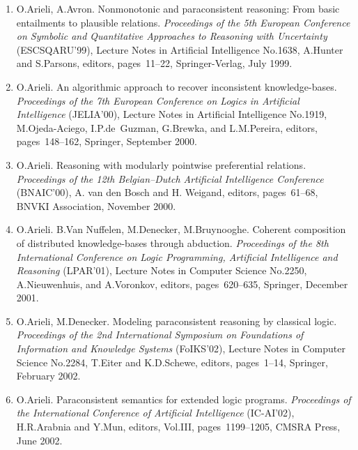 \documentclass{article}
\begin{document}
\begin{enumerate}
   \item O.Arieli, A.Avron.
         Nonmonotonic and paraconsistent reasoning: From basic entailments
         to plausible relations. {\em Proceedings of the 5th European Conference on
         Symbolic and Quantitative Approaches to Reasoning with
         Uncertainty\/} (ESCSQARU'99), Lecture Notes in
         Artificial Intelligence No.1638, A.Hunter and S.Parsons, editors,
         pages~11--22, Springer-Verlag, July 1999.

   \item O.Arieli.
         An algorithmic approach to recover inconsistent knowledge-bases.
         {\em Proceedings of the 7th European Conference on Logics in Artificial
         Intelligence\/} (JELIA'00), Lecture Notes in Artificial Intelligence
         No.1919, M.Ojeda-Aciego, I.P.de~Guzman, G.Brewka, and L.M.Pereira,
         editors, pages~148--162, Springer, September 2000.

   \item O.Arieli.
         Reasoning with modularly pointwise preferential relations.
         {\em Proceedings of the 12th Belgian--Dutch Artificial Intelligence
         Conference\/} (BNAIC'00), A. van den Bosch and H. Weigand, editors,
         pages~61--68, BNVKI Association, November 2000.

   \item O.Arieli. B.Van Nuffelen, M.Denecker, M.Bruynooghe.
         Coherent composition of distributed knowledge-bases through
         abduction. {\em Proceedings of the 8th International Conference on
         Logic Programming, Artificial Intelligence and Reasoning\/}
         (LPAR'01), Lecture Notes in Computer Science No.2250,
         A.Nieuwenhuis, and A.Voronkov, editors, pages~620--635,
         Springer, December 2001.

   \item O.Arieli, M.Denecker.
         Modeling paraconsistent reasoning by classical logic.
         {\em Proceedings of the 2nd International Symposium on Foundations of
         Information and Knowledge Systems\/} (FoIKS'02),
         Lecture Notes in Computer Science No.2284, T.Eiter and
         K.D.Schewe, editors, pages~1--14, Springer, February 2002.

   \item O.Arieli.
         Paraconsistent semantics for extended logic programs.
         {\em Proceedings of the International Conference of Artificial Intelligence\/}
         (IC-AI'02), H.R.Arabnia and Y.Mun, editors,
         Vol.III, pages~1199--1205, CMSRA Press, June 2002.


\end{enumerate}
\end{document}
